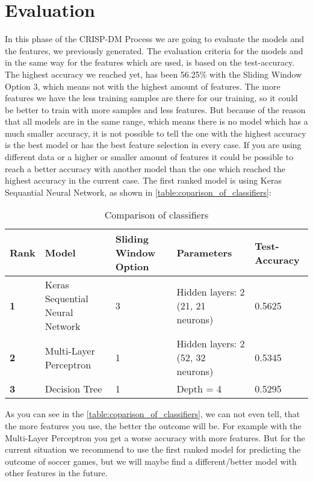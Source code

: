 
\chapter{Evaluation}
In this phase of the CRISP-DM Process we are going to evaluate the models and the features, we previously generated.\newline
The evaluation criteria for the models and in the same way for the features which are used, is based on the test-accuracy. The highest accuracy we reached yet, has been 56.25\% with the Sliding Window Option 3, which means not with the highest amount of features. The more features we have the less training samples are there for our training, so it could be better to train with more samples and less features. But because of the reason that all models are in the same range, which means there is no model which has a much smaller accuracy, it is not possible to tell the one with the highest accuracy is the best model or has the best feature selection in every case. If you are using different data or a higher or smaller amount of features it could be possible to reach a better accuracy with another model than the one which reached the highest accuracy in the current case. The first ranked model is using Keras Sequantial Neural Network, as shown in \autoref{table:coparison_of_classifiers}:

\begin{table}[H]
\centering
\begin{tabular}{|p{2.5cm}|p{2.5cm}|p{2.5cm}|p{2.5cm}|p{2.5cm}|}
\hline

\textbf{Rank} & \textbf{Model} & \textbf{Sliding Window Option} & \textbf{Parameters} & \textbf{Test-Accuracy} \\ \hline
\textbf{1} & Keras Sequential Neural Network & 3 & Hidden layers: 2 (21, 21 neurons) & 0.5625 \\ \hline
\textbf{2} & Multi-Layer Perceptron & 1 & Hidden layers: 2 (52, 32 neurons) & 0.5345 \\ \hline
\textbf{3} & Decision Tree & 1 & Depth = 4 & 0.5295 \\ \hline

\end{tabular}
\caption{Comparison of classifiers}
\label{table:coparison_of_classifiers}
\end{table}

As you can see in the \autoref{table:coparison_of_classifiers}, we can not even tell, that the more features you use, the better the outcome will be. For example with the Multi-Layer Perceptron you get a worse accuracy with more features. But for the current situation we recommend to use the first ranked model for predicting the outcome of soccer games, but we will maybe find a different/better model with other features in the future.